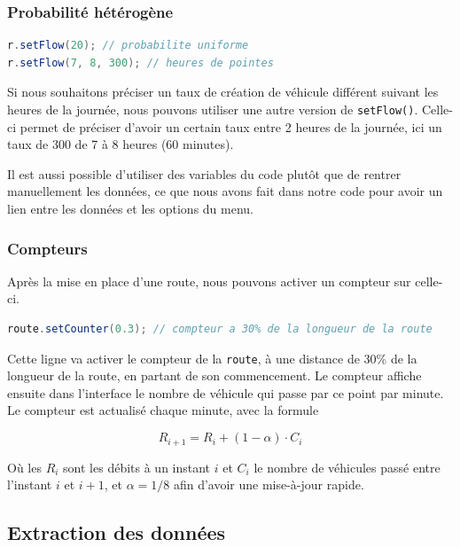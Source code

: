 \documentclass[a4paper,11pt, titlepage]{extarticle}
\begin{document}
\subsubsection{Probabilité hétérogène}

\begin{lstlisting}[language=Java]
r.setFlow(20); // probabilite uniforme
r.setFlow(7, 8, 300); // heures de pointes
\end{lstlisting}

Si nous souhaitons préciser un taux de création de véhicule différent suivant les heures de la journée, nous pouvons utiliser une autre version de \texttt{setFlow()}. Celle-ci permet de préciser d'avoir un certain taux entre 2 heures de la journée, ici un taux de 300 de 7 à 8 heures (60 minutes).

Il est aussi possible d'utiliser des variables du code plutôt que de rentrer manuellement les données, ce que nous avons fait dans notre code pour avoir un lien entre les données et les options du menu.
\vspace{0.5cm}
\subsubsection{Compteurs}

Après la mise en place d'une route, nous pouvons activer un compteur sur celle-ci.

\begin{lstlisting}[language=Java]
route.setCounter(0.3); // compteur a 30% de la longueur de la route
\end{lstlisting}

Cette ligne va activer le compteur de la \texttt{route}, à une distance de 30\% de la longueur de la route, en partant de son commencement. Le compteur affiche ensuite dans l'interface le nombre de véhicule qui passe par ce point par minute. Le compteur est actualisé chaque minute, avec la formule

\begin{equation*}
R_{i+1} = R_i + (1-\alpha) \cdot C_i
\end{equation*}

Où les $R_i$ sont les débits à un instant $i$ et $C_i$ le nombre de véhicules passé entre l'instant $i$ et $i+1$, et $\alpha = 1/8$ afin d'avoir une mise-à-jour rapide.

\subsection{Extraction des données}
\end{document}
